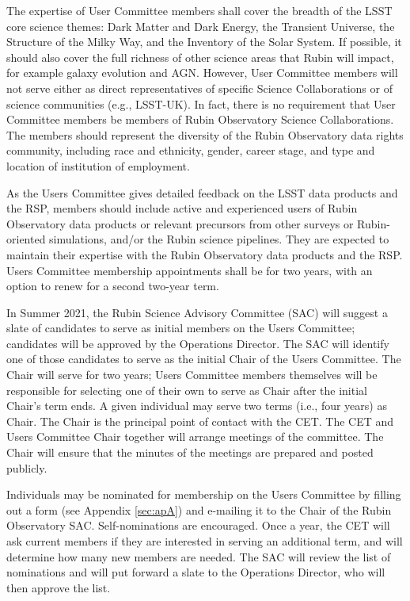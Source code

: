 \documentclass[OPS,toc]{lsstdoc}
\begin{document}
The expertise of User Committee members shall cover the breadth of the LSST core science themes: Dark Matter and Dark Energy, the Transient Universe, the Structure of the Milky Way, and the Inventory of the Solar System.
If possible, it should also cover the full richness of other science areas that Rubin will impact, for example galaxy evolution and AGN.
However, User Committee members will not serve either as direct representatives of specific Science Collaborations or of science communities (e.g., LSST-UK).
In fact, there is no requirement that User Committee members be members of Rubin Observatory Science Collaborations.
The members should represent the diversity of the Rubin Observatory data rights community, including race and ethnicity, gender, career stage, and type and location of institution of employment.

As the Users Committee gives detailed feedback on the LSST data products and the RSP, members should include active and experienced users of Rubin Observatory data products or relevant precursors from other surveys or Rubin-oriented simulations, and/or the Rubin science pipelines.
They are expected to maintain their expertise with the Rubin Observatory data products and the RSP.
Users Committee membership appointments shall be for two years, with an option to renew for a second two-year term. 

In Summer 2021, the Rubin Science Advisory Committee (SAC) will suggest a slate of candidates to serve as initial members on the Users Committee; candidates will be approved by the Operations Director.
The SAC will identify one of those candidates to serve as the initial Chair of the Users Committee.
The Chair will serve for two years; Users Committee members themselves will be responsible for selecting one of their own to serve as Chair after the initial Chair’s term ends.
A given individual may serve two terms (i.e., four years) as Chair.
The Chair is the principal point of contact with the CET.
The CET and Users Committee Chair together will arrange meetings of the committee.
The Chair will ensure that the minutes of the meetings are prepared and posted publicly. 

Individuals may be nominated for membership on the Users Committee by filling out a form (see Appendix \ref{sec:apA}) and e-mailing it to the Chair of the Rubin Observatory SAC.
Self-nominations are  encouraged.
Once a year, the CET will ask current members if they are interested in  serving an additional term, and will determine how many new members are needed.
The SAC will review the list of nominations and will put forward a slate to the Operations Director, who will then approve the list. 
\end{document}
